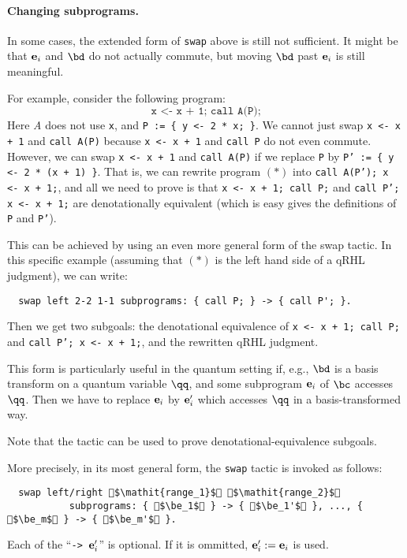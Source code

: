 \documentclass{article}
\begin{document}
\paragraph{Changing subprograms.}
In some cases, the extended form of \texttt{swap} above is still not sufficient.
It might be that $\mathbf e_i$ and $\bd$ do not actually commute, but moving $\bd$ past $\mathbf e_i$ is still meaningful.

For example, consider the following program:
\begin{equation*}
  \texttt{x <- x + 1; call A(P);}
  \tag{*}
\end{equation*}
Here \emph{A} does not use \texttt{x}, and \texttt{P := \{ y <- 2 * x; \}}.
We cannot just swap \texttt{x <- x + 1} and \texttt{call A(P)} because \texttt{x <- x + 1} and \texttt{call P} do not even commute.
However, we can swap \texttt{x <- x + 1} and \texttt{call A(P)} if we replace \texttt{P} by \texttt{P' := \{ y <- 2 * (x + 1) \}}.
That is, we can rewrite program $(*)$ into \texttt{call A(P'); x <- x + 1;}, and all we need to prove is that \texttt{x <- x + 1; call P;} and \texttt{call P'; x <- x + 1;} are denotationally equivalent (which is easy gives the definitions of \texttt{P} and \texttt{P'}).

This can be achieved by using an even more general form of the swap tactic.
In this specific example (assuming that $(*)$ is the left hand side of a qRHL judgment), we can write:
\begin{lstlisting}
  swap left 2-2 1-1 subprograms: { call P; } -> { call P'; }.
\end{lstlisting}
Then we get two subgoals: the denotational equivalence of \texttt{x <- x + 1; call P;} and \texttt{call P'; x <- x + 1;}, and the rewritten qRHL judgment.

\medskip

This form is particularly useful in the quantum setting if, e.g., $\bd$ is a basis transform on a quantum variable $\qq$, and some subprogram $\mathbf e_i$ of $\bc$ accesses $\qq$.
Then we have to replace $\mathbf e_i$ by $\mathbf e_i'$ which accesses $\qq$ in a basis-transformed way.

Note that the  tactic can be used to prove denotational-equivalence subgoals.

\medskip

More precisely, in its most general form, the \texttt{swap} tactic is invoked as follows:
\begin{lstlisting}
  swap left/right $\mathit{range_1}$ $\mathit{range_2}$
           subprograms: { $\be_1$ } -> { $\be_1'$ }, ..., { $\be_m$ } -> { $\be_m'$ }.
\end{lstlisting}
Each of the ``\texttt{-> $\mathbf e_i'$}'' is optional. If it is ommitted, $\mathbf e_i':=\mathbf e_i$ is used.
\end{document}
